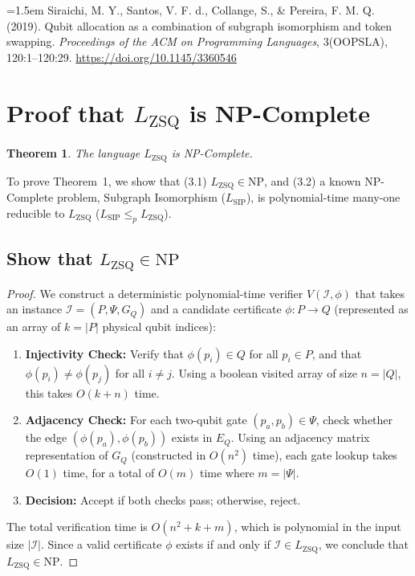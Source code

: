 \documentclass[11pt, a4paper]{article}
\newtheorem{theorem}{Theorem}
\begin{document}
\noindent\hangindent=1.5em
Siraichi, M. Y., Santos, V. F. d., Collange, S., \& Pereira, F. M. Q. (2019). Qubit allocation as a combination of subgraph isomorphism and token swapping. \textit{Proceedings of the ACM on Programming Languages}, 3(OOPSLA), 120:1--120:29. \url{https://doi.org/10.1145/3360546}\par

\section{Proof that \texorpdfstring{$L_{\text{ZSQ}}$}{LZSQ} is NP-Complete}

\begin{theorem}
The language $L_{\text{ZSQ}}$ is NP-Complete.
\end{theorem}

To prove Theorem~1, we show that (3.1) $L_{\text{ZSQ}} \in \text{NP}$, and (3.2) a known NP-Complete problem, Subgraph Isomorphism ($L_{\text{SIP}}$), is polynomial-time many-one reducible to $L_{\text{ZSQ}}$ ($L_{\text{SIP}} \le_p L_{\text{ZSQ}}$).

\subsection{Show that \texorpdfstring{$L_{\text{ZSQ}} \in \text{NP}$}{LZSQ in NP}}

\begin{proof}
We construct a deterministic polynomial-time verifier $V(\mathcal{I}, \phi)$ that takes an instance $\mathcal{I} = (P, \Psi, G_Q)$ and a candidate certificate $\phi: P \to Q$ (represented as an array of $k = |P|$ physical qubit indices):
\begin{enumerate}
    \item \textbf{Injectivity Check:} Verify that $\phi(p_i) \in Q$ for all $p_i \in P$, and that $\phi(p_i) \neq \phi(p_j)$ for all $i \neq j$. Using a boolean visited array of size $n = |Q|$, this takes $O(k + n)$ time.
    \item \textbf{Adjacency Check:} For each two-qubit gate $(p_a, p_b) \in \Psi$, check whether the edge $(\phi(p_a), \phi(p_b))$ exists in $E_Q$. Using an adjacency matrix representation of $G_Q$ (constructed in $O(n^2)$ time), each gate lookup takes $O(1)$ time, for a total of $O(m)$ time where $m = |\Psi|$.
    \item \textbf{Decision:} Accept if both checks pass; otherwise, reject.
\end{enumerate}
The total verification time is $O(n^2 + k + m)$, which is polynomial in the input size $|\mathcal{I}|$. Since a valid certificate $\phi$ exists if and only if $\mathcal{I} \in L_{\text{ZSQ}}$, we conclude that $L_{\text{ZSQ}} \in \text{NP}$.
\end{proof}
\end{document}

